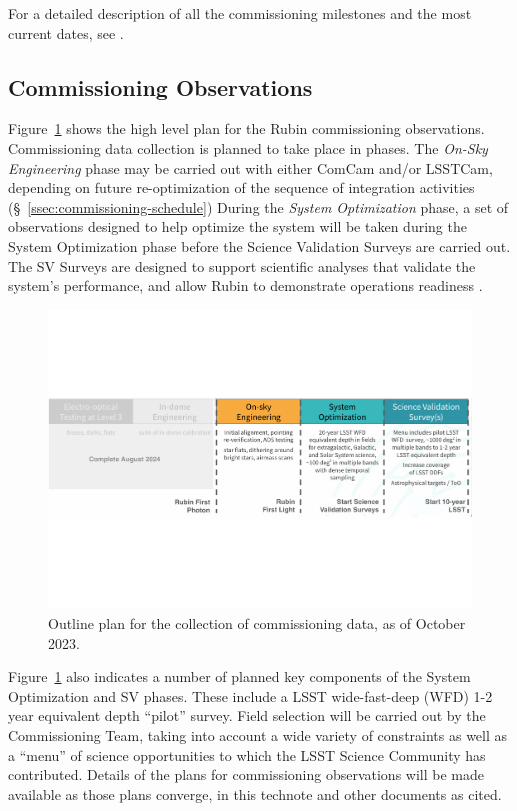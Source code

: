 For a detailed description of all the commissioning milestones and the most current dates, see .


\subsection{Commissioning Observations}
\label{ssec:commissioning-observations}

Figure~\ref{fig:commissioning} shows the high level plan for the Rubin commissioning observations. 
Commissioning data collection is planned to take place in phases.
The \textit{On-Sky Engineering} phase may be carried out with either ComCam and/or LSSTCam, depending on future re-optimization of the sequence of integration activities (\S~\ref{ssec:commissioning-schedule})
During the \textit{System Optimization} phase,  a set of observations designed to help optimize the system will be taken during the System Optimization phase before the Science Validation Surveys are carried out. 
The SV Surveys are designed to support scientific analyses that validate the system's performance, and allow Rubin to demonstrate operations readiness .

\begin{figure}[htb]
\centering
\includegraphics[width=0.95\linewidth]{figures/commissioning-plan}
\caption{Outline plan for the collection of commissioning data, as of October 2023.}
\label{fig:commissioning}
\end{figure}

Figure~\ref{fig:commissioning} also indicates a number of planned key components of the System Optimization and SV phases.
These include a LSST wide-fast-deep (WFD) 1-2 year equivalent depth ``pilot'' survey.
Field selection will be carried out by the Commissioning Team, taking into account a wide variety of constraints as well as a ``menu'' of science opportunities to which the LSST Science Community has contributed.
Details of the plans for commissioning observations will be made available as those plans converge, in this technote and other documents as cited.
